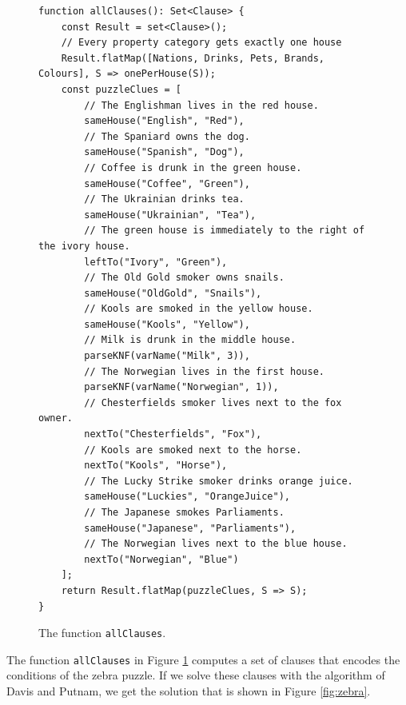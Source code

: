 \begin{figure}[!ht]
\centering
\begin{verbatim}
function allClauses(): Set<Clause> {
    const Result = set<Clause>();
    // Every property category gets exactly one house
    Result.flatMap([Nations, Drinks, Pets, Brands, Colours], S => onePerHouse(S));
    const puzzleClues = [
        // The Englishman lives in the red house.
        sameHouse("English", "Red"),
        // The Spaniard owns the dog.
        sameHouse("Spanish", "Dog"), 
        // Coffee is drunk in the green house.
        sameHouse("Coffee", "Green"),
        // The Ukrainian drinks tea.
        sameHouse("Ukrainian", "Tea"),
        // The green house is immediately to the right of the ivory house.
        leftTo("Ivory", "Green"), 
        // The Old Gold smoker owns snails.
        sameHouse("OldGold", "Snails"), 
        // Kools are smoked in the yellow house.
        sameHouse("Kools", "Yellow"), 
        // Milk is drunk in the middle house.
        parseKNF(varName("Milk", 3)), 
        // The Norwegian lives in the first house.
        parseKNF(varName("Norwegian", 1)), 
        // Chesterfields smoker lives next to the fox owner.
        nextTo("Chesterfields", "Fox"),                                         
        // Kools are smoked next to the horse.
        nextTo("Kools", "Horse"), 
        // The Lucky Strike smoker drinks orange juice.
        sameHouse("Luckies", "OrangeJuice"),                                              
        // The Japanese smokes Parliaments.
        sameHouse("Japanese", "Parliaments"), 
        // The Norwegian lives next to the blue house.
        nextTo("Norwegian", "Blue") 
    ];
    return Result.flatMap(puzzleClues, S => S);
}
\end{verbatim}
\vspace*{-0.3cm}
\caption{The function \texttt{allClauses}.}
\label{fig:zebra-allClauses}
\end{figure}
The function \texttt{allClauses} in Figure \ref{fig:zebra-allClauses} computes a set of clauses that encodes the
conditions of the zebra puzzle.  If we solve these clauses with the algorithm of
Davis and Putnam, we get the solution that is shown in Figure \ref{fig:zebra}.

